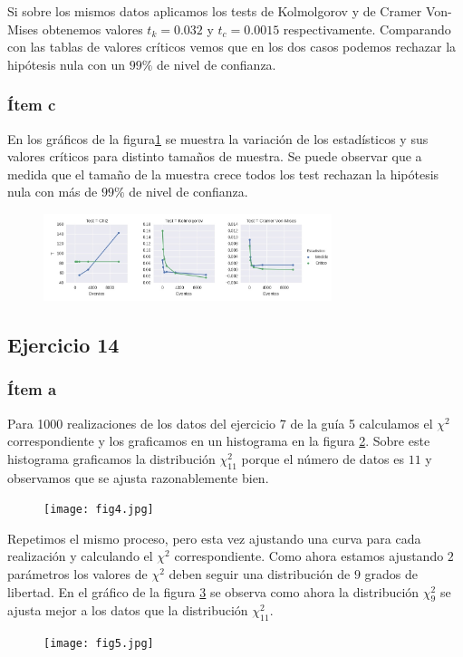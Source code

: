 Si sobre los mismos datos aplicamos los tests de Kolmolgorov y de Cramer Von-Mises obtenemos valores $t_k=0.032$ y $t_c=0.0015$ respectivamente.
Comparando con las tablas de valores críticos vemos que en los dos casos podemos rechazar la hipótesis nula con un $99\%$ de nivel de confianza.

\subsubsection*{Ítem c}
En los gráficos de la figura\ref{fig:fig3} se muestra la variación de los estadísticos y sus valores críticos para distinto tamaños de muestra.
Se puede observar que a medida que el tamaño de la muestra crece todos los test rechazan la hipótesis nula con más de $99\%$ de nivel de confianza.

\begin{figure}
\centering
\includegraphics[width=0.75\textwidth]{fig3.jpg}
\caption[]{}
\label{fig:fig3}
\end{figure}


\subsection*{Ejercicio 14}
\subsubsection*{Ítem a}
Para 1000 realizaciones de los datos del ejercicio 7 de la guía 5 calculamos el $\chi^2$ correspondiente y los graficamos en un histograma en la figura \ref{fig:fig4}.
Sobre este histograma graficamos la distribución $\chi^2_{11}$ porque el número de datos es $11$ y observamos que se ajusta razonablemente bien.

\begin{figure}
\centering
\texttt{[image: fig4.jpg]}
\caption[]{}
\label{fig:fig4}
\end{figure}


Repetimos el mismo proceso, pero esta vez ajustando una curva para cada realización y calculando el $\chi^2$ correspondiente.
Como ahora estamos ajustando $2$ parámetros los valores de $\chi^2$ deben seguir una distribución de $9$ grados de libertad.
En el gráfico de la figura \ref{fig:fig5} se observa como ahora la distribución $\chi^2_9$ se ajusta mejor a los datos que la distribución $\chi^2_{11}$.

\begin{figure}
\centering
\texttt{[image: fig5.jpg]}
\caption[]{}
\label{fig:fig5}
\end{figure}


